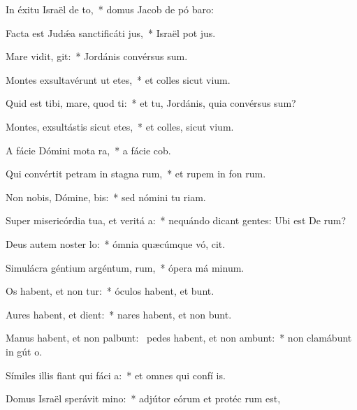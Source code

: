 \item In éxitu Israël de to,~* domus Jacob de pó baro:
\item Facta est Judǽa sanctificáti jus,~* Israël pot jus.
\item Mare vidit,  git:~* Jordánis convérsus  sum.
\item Montes exsultavérunt ut etes,~* et colles sicut  vium.
\item Quid est tibi, mare, quod ti:~* et tu, Jordánis, quia convérsus  sum?
\item Montes, exsultástis sicut etes,~* et colles, sicut  vium.
\item A fácie Dómini mota  ra,~* a fácie  cob.
\item Qui convértit petram in stagna rum,~* et rupem in fon rum.
\item Non nobis, Dómine,  bis:~* sed nómini tu  riam.
\item Super misericórdia tua, et veritá a:~* nequándo dicant gentes: Ubi est De rum?
\item Deus autem noster  lo:~* ómnia quæcúmque vó, cit.
\item Simulácra géntium argéntum,  rum,~* ópera má minum.
\item Os habent, et non tur:~* óculos habent, et  bunt.
\item Aures habent, et  dient:~* nares habent, et non bunt.
\item Manus habent, et non palbunt:~\pscross{} pedes habent, et non ambunt:~* non clamábunt in gút o.
\item Símiles illis fiant qui fáci a:~* et omnes qui confí  is.
\item Domus Israël sperávit  mino:~* adjútor eórum et protéc rum est,
